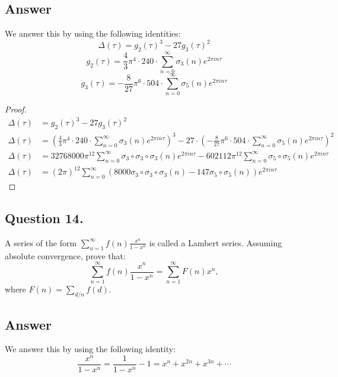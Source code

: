 \subsection*{Answer}
\noindent
We answer this by using the following identities:
\[
    \Delta(\tau)={g_2(\tau)}^3-27{g_3(\tau)}^2
\]
\[
    {g_2(\tau)}=\frac{4}{3}\pi^4 \cdot 240 \cdot \sum_{n=0}^{\infty}\sigma_3(n)e^{2\pi i n \tau}
\]
\[
    {g_3(\tau)}=-\frac{8}{27}\pi^6 \cdot 504 \cdot \sum_{n=0}^{\infty}\sigma_5(n)e^{2\pi i n \tau}
\]

\begin{proof}
    \begin{align*}
        \Delta(\tau)&={g_2(\tau)}^3-27{g_3(\tau)}^2 \\
        \Delta(\tau)&={(\frac{4}{3}\pi^4 \cdot 240 \cdot \sum_{n=0}^{\infty}\sigma_3(n)e^{2\pi i n \tau})}^3-27 \cdot {(-\frac{8}{27}\pi^6 \cdot 504 \cdot \sum_{n=0}^{\infty}\sigma_5(n)e^{2\pi i n \tau})}^2 \\
        \Delta(\tau)&=32768000\pi^{12} \sum_{n=0}^{\infty}\sigma_3 \circ \sigma_3 \circ \sigma_3(n)e^{2\pi i n \tau} - 602112\pi^{12} \sum_{n=0}^{\infty}\sigma_5 \circ \sigma_5(n)e^{2\pi i n \tau} \\
        \Delta(\tau)&=(2\pi)^{12}\sum_{n=0}^{\infty} (8000\sigma_3 \circ \sigma_3 \circ \sigma_3(n)-147\sigma_5 \circ \sigma_5(n))e^{2\pi i n \tau}
    \end{align*}
\end{proof}


\subsection{Question 14.}
\noindent
A series of the form $\sum_{n=1}^{\infty}f(n)\frac{x^n}{1-x^n}$ is called a Lambert series. Assuming absolute
convergence, prove that:
\[
    \sum_{n=1}^{\infty}f(n) \frac{x^n}{1-x^n} = \sum_{n=1}^{\infty} F(n)x^n,
\]
where $F(n) = \sum_{d/n}f(d)$.

\subsection*{Answer}
\noindent
We answer this by using the following identity:
\[
    \frac{x^n}{1-x^n} = \frac{1}{1-x^n}-1 = x^n+x^{2n}+x^{3n}+ \cdots
\]

